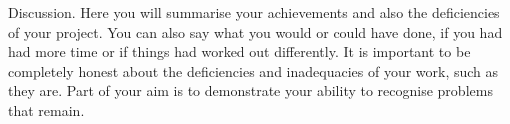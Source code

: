Discussion. Here you will summarise your achievements and also the deficiencies of your project. You can also say what you would or could have done, if you had had more time or if things had worked out differently. It is important to be completely honest about the deficiencies and inadequacies of your work, such as they are. Part of your aim is to demonstrate your ability to recognise problems that remain.